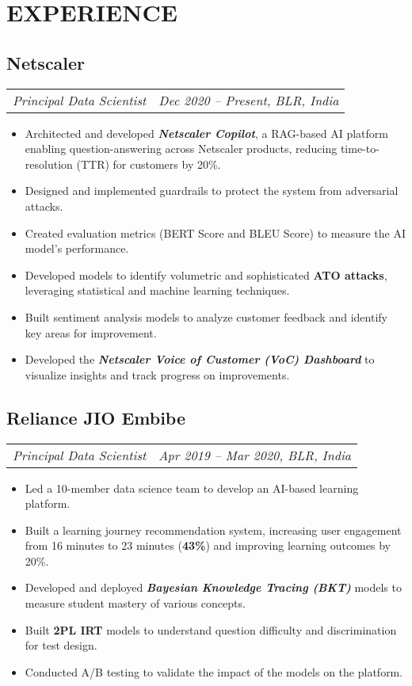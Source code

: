 \documentclass[11pt,a4paper]{moderncv}
\newcommand*{\experienceentry}[5][1mm]{
    \subsection{#2} \vspace{-1.5mm}
    \small{
    \begin{tabularx}{\textwidth}{LR}
        {\itshape #3} & {\itshape #4, #5}
    \end{tabularx}
    }
    \par\addvspace{#1}
}
\begin{document}
\maketitle
\vspace{-10.0mm}

\begin{minipage}[t]{0.64\textwidth}
\section{EXPERIENCE}

\experienceentry{Netscaler}{Principal Data Scientist}{Dec 2020 -- Present}{BLR, India}
\vspace{-5mm}
\begin{small}
\begin{itemize}
    \item Architected and developed \textbf{\textit{Netscaler Copilot}}, a RAG-based AI platform enabling question-answering across Netscaler products, reducing time-to-resolution (TTR) for customers by 20\%.
    \item Designed and implemented guardrails to protect the system from adversarial attacks.
    \item Created evaluation metrics (BERT Score and BLEU Score) to measure the AI model’s performance.
    \item Developed models to identify volumetric and sophisticated \textbf{ATO attacks}, leveraging statistical and machine learning techniques.
    \item Built sentiment analysis models to analyze customer feedback and identify key areas for improvement.
    \item Developed the \textbf{\textit{Netscaler Voice of Customer (VoC) Dashboard}} to visualize insights and track progress on improvements.
\end{itemize}
\end{small}

\vspace{0.25mm}

\experienceentry{Reliance JIO Embibe}{Principal Data Scientist}{Apr 2019 -- Mar 2020}{BLR, India}
\vspace{-5mm}
\begin{itemize}
    \item Led a 10-member data science team to develop an AI-based learning platform.
    \item Built a learning journey recommendation system, increasing user engagement from 16 minutes to 23 minutes (\textbf{43\%}) and improving learning outcomes by 20\%.
    \item Developed and deployed \textbf{\textit{Bayesian Knowledge Tracing (BKT)}} models to measure student mastery of various concepts.
    \item Built \textbf{2PL IRT} models to understand question difficulty and discrimination for test design.
    \item Conducted A/B testing to validate the impact of the models on the platform.
\end{itemize}
\vspace{0.25mm}


\end{minipage}
\end{document}
